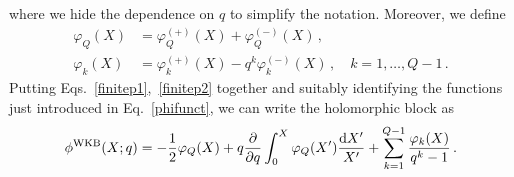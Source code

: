 \documentclass[a4paper,11pt]{article}
\theoremstyle{definition}
\newcommand{\rd}{{\rm d}}
\newcommand{\be}{\begin{equation}}
\newcommand{\ee}{\end{equation}}
\begin{document}
%
where we hide the dependence on $q$ to simplify the notation. Moreover, we define
%
\begin{subequations} \label{phifunct}
\begin{align}
\varphi_Q(X)&=  \varphi^{(+)}_Q(X) + \varphi^{(-)}_Q(X)  \, , \\
\varphi_k(X)&=  \varphi^{(+)}_k(X) - q^k \varphi^{(-)}_k(X) \, , \quad k=1, \dots, Q-1 \, .
\end{align}
\end{subequations}
%
Putting Eqs.~\eqref{finitep1},~\eqref{finitep2} together and suitably identifying the functions just introduced in Eq.~\eqref{phifunct}, we can write the holomorphic block as
%
\be \label{phirat}
\phi^{\rm WKB}(X;q)= -{1\over 2} \varphi_Q(X) + q{\partial \over \partial q} \int_0^X \varphi_Q(X') {\rd X '\over X'} + 
\sum_{k=1}^{Q-1} { \varphi_k(X) \over q^k-1} \, .
\ee
\end{document}
